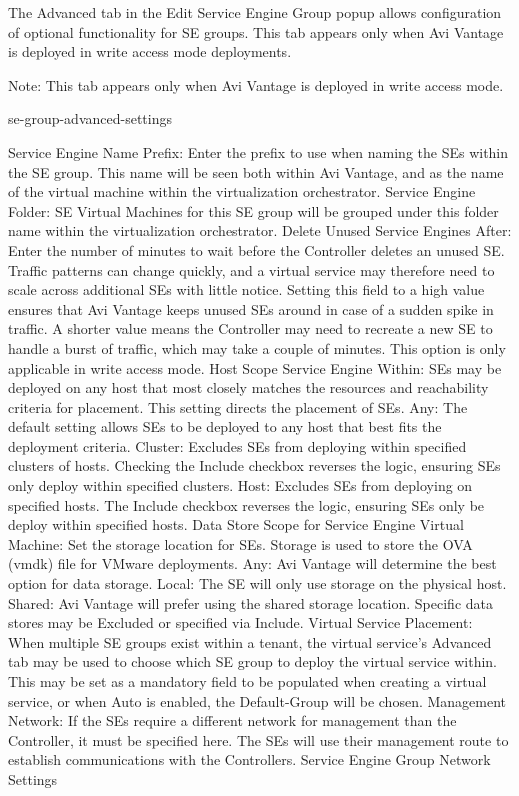 \documentclass[letterpaper,10pt,english]{sphinxmanual}
\begin{document}
The Advanced tab in the Edit Service Engine Group popup allows configuration of optional functionality for SE groups. This tab appears only when Avi Vantage is deployed in write access mode deployments.

Note: This tab appears only when Avi Vantage is deployed in write access mode.

se-group-advanced-settings

Service Engine Name Prefix: Enter the prefix to use when naming the SEs within the SE group. This name will be seen both within Avi Vantage, and as the name of the virtual machine within the virtualization orchestrator.
Service Engine Folder: SE Virtual Machines for this SE group will be grouped under this folder name within the virtualization orchestrator.
Delete Unused Service Engines After: Enter the number of minutes to wait before the Controller deletes an unused SE. Traffic patterns can change quickly, and a virtual service may therefore need to scale across additional SEs with little notice. Setting this field to a high value ensures that Avi Vantage keeps unused SEs around in case of a sudden spike in traffic. A shorter value means the Controller may need to recreate a new SE to handle a burst of traffic, which may take a couple of minutes. This option is only applicable in write access mode.
Host Scope Service Engine Within: SEs may be deployed on any host that most closely matches the resources and reachability criteria for placement. This setting directs the placement of SEs.
Any: The default setting allows SEs to be deployed to any host that best fits the deployment criteria.
Cluster: Excludes SEs from deploying within specified clusters of hosts. Checking the Include checkbox reverses the logic, ensuring SEs only deploy within specified clusters.
Host: Excludes SEs from deploying on specified hosts. The Include checkbox reverses the logic, ensuring SEs only be deploy within specified hosts.
Data Store Scope for Service Engine Virtual Machine: Set the storage location for SEs. Storage is used to store the OVA (vmdk) file for VMware deployments.
Any: Avi Vantage will determine the best option for data storage.
Local: The SE will only use storage on the physical host.
Shared: Avi Vantage will prefer using the shared storage location. Specific data stores may be Excluded or specified via Include.
Virtual Service Placement: When multiple SE groups exist within a tenant, the virtual service's Advanced tab may be used to choose which SE group to deploy the virtual service within. This may be set as a mandatory field to be populated when creating a virtual service, or when Auto is enabled, the Default-Group will be chosen.
Management Network: If the SEs require a different network for management than the Controller, it must be specified here. The SEs will use their management route to establish communications with the Controllers.
Service Engine Group Network Settings
\end{document}
